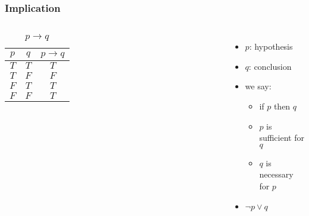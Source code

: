 \documentclass[dvipsnames]{beamer}
\begin{document}
\begin{frame}
  \frametitle{Implication}

  \begin{columns}
    \begin{table}
      \caption{$p \rightarrow q$}
      \begin{tabular}{|c|c||c|}\hline
        $p$ & $q$ & $p \rightarrow q$\\\hline\hline
        $T$ & $T$ & $T$              \\\hline
        $T$ & $F$ & $F$              \\\hline
        $F$ & $T$ & $T$              \\\hline
        $F$ & $F$ & $T$              \\\hline
      \end{tabular}
    \end{table}

    \pause
    \begin{itemize}
      \item $p$: \alert{hypothesis}
      \item $q$: \alert{conclusion}

      \item we say:
      \begin{itemize}
        \item if $p$ then $q$
        \item $p$ is sufficient for $q$
        \item $q$ is necessary for $p$
      \end{itemize}

      \pause
      \item $\neg p \vee q$
    \end{itemize}
  \end{columns}
\end{frame}
\end{document}
